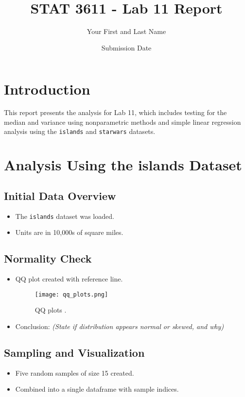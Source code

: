 \documentclass{article}
\title{STAT 3611 - Lab 11 Report}
\author{Your First and Last Name}
\date{Submission Date}
\begin{document}
\maketitle

\section{Introduction}
This report presents the analysis for Lab 11, which includes testing for the median and variance using nonparametric methods and simple linear regression analysis using the \texttt{islands} and \texttt{starwars} datasets.

\section{Analysis Using the islands Dataset}

\subsection{Initial Data Overview}
\begin{itemize}
    \item The \texttt{islands} dataset was loaded.
    \item Units are in 10,000s of square miles.
\end{itemize}

\subsection{Normality Check}
\begin{itemize}
    \item QQ plot created with reference line.
    \begin{figure}[H]
    \centering
    \texttt{[image: qq\_plots.png]} %
    \caption{ QQ plots .}
    \label{fig:height_dists}
\end{figure}
    \item Conclusion: \textit{(State if distribution appears normal or skewed, and why)}
\end{itemize}

\subsection{Sampling and Visualization}
\begin{itemize}
    \item Five random samples of size 15 created.
    \item Combined into a single dataframe with sample indices.
\end{itemize}
\end{document}
